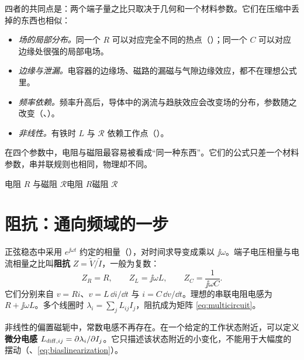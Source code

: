 四者的共同点是：两个端子量之比只取决于几何和一个材料参数。它们在压缩中丢掉的东西也相似：
\begin{itemize}
\item \emph{场的局部分布。}同一个 $R$ 可以对应完全不同的热点（）；同一个 $C$ 可以对应边缘处很强的局部电场。
\item \emph{边缘与泄漏。}电容器的边缘场、磁路的漏磁与气隙边缘效应，都不在理想公式里。
\item \emph{频率依赖。}频率升高后，导体中的涡流与趋肤效应会改变场的分布，参数随之改变（、）。
\item \emph{非线性。}有铁时 $L$ 与 $\mathcal R$ 依赖工作点（）。
\end{itemize}

在四个参数中，电阻与磁阻最容易被看成“同一种东西”。它们的公式只差一个材料参数，串并联规则也相同，物理却不同。

\begin{compare}{电阻 $R$ 与磁阻 $\mathcal R$}{电阻 $R$}{磁阻 $\mathcal R$}
\end{compare}

\section{阻抗：通向频域的一步}\label{sec:systems-impedance}

正弦稳态中采用 $e^{\jj\omega t}$ 约定的相量（），对时间求导变成乘以 $\jj\omega$。端子电压相量与电流相量之比叫\textbf{阻抗} $Z=\widetilde V/\widetilde I$，一般为复数：
\begin{equation}
Z_R=R,\qquad Z_L=\jj\omega L,\qquad Z_C=\frac{1}{\jj\omega C}.
\label{eq:impedance}
\end{equation}
它们分别来自 $v=Ri$、$v=L\,\dd i/\dd t$ 与 $i=C\,\dd v/\dd t$。理想的串联电阻电感为 $R+\jj\omega L$。多个线圈时 $\lambda_i=\sum_jL_{ij}I_j$，阻抗成为矩阵 \eqref{eq:multicircuit}。

非线性的偏置磁轭中，常数电感不再存在。在一个给定的工作状态附近，可以定义\textbf{微分电感} $L_{{\rm diff},ij}=\partial\lambda_i/\partial I_j$。它只描述该状态附近的小变化，不能用于大幅度的摆动（、\eqref{eq:biaslinearization}）。

